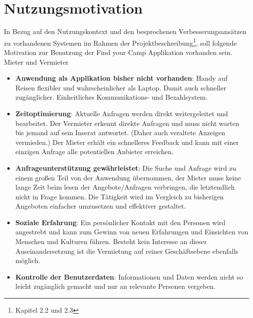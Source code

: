 
\section{Nutzungsmotivation}
In Bezug auf den Nutzungskontext und den besprochenen Verbesserungsansätzen zu vorhandenen Systemen im Rahmen der Projektbeschreibung\footnote{Kapitel 2.2 und 2.3}, soll folgende Motivation zur Benutzung der Find your Camp Applikation vorhanden sein.\\

Mieter und Vermieter
\begin{itemize}
   \item 
   \textbf{Anwendung als Applikation bisher nicht vorhanden}: Handy auf Reisen flexibler und wahrscheinlicher als Laptop. Damit auch schneller zugänglicher. Einheitliches Kommunikations- und Bezahlsystem.

   \item 
   \textbf{Zeitoptimierung}: Aktuelle Anfragen werden direkt weitergeleitet und bearbeitet. Der Vermieter erkennt direkte Anfragen und muss nicht warten bis jemand auf sein Inserat antwortet. (Daher auch veraltete Anzeigen vermieden.) Der Mieter erhält ein schnelleres Feedback und kann mit einer einzigen Anfrage alle potentiellen Anbieter erreichen.

   \item 
   \textbf{Anfrageunterstützung gewährleistet}: Die Suche und Anfrage wird zu einem großen Teil von der Anwendung übernommen, der Mieter muss keine lange Zeit beim lesen der Angebote/Anfragen verbringen, die letztendlich nicht in Frage kommen. Die Tätigkeit wird im Vergleich zu bisherigen Angeboten einfacher umzusetzen und effektiver gestaltet.

   \item 
   \textbf{Soziale Erfahrung}: Ein persönlicher Kontakt mit den Personen wird angestrebt und kann zum Gewinn von neuen Erfahrungen und Einsichten von Menschen und Kulturen führen.
    Besteht kein Interesse an dieser Auseinandersetzung ist die Vermietung auf reiner Geschäftsebene ebenfalls möglich.

   \item
   \textbf{Kontrolle der Benutzerdaten}: Informationen und Daten werden nicht so leicht zugänglich gemacht und nur an relevante Personen vergeben.

\end{itemize}

